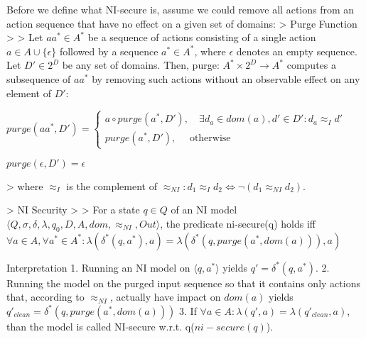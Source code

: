 \documentclass[a4paper]{article}
\begin{document}
\begin{multicols}{3}
    Before we define what NI-secure is, assume we could remove all actions from an action sequence that have no effect on a given set of domains:
    > Purge Function
    >
    > Let $aa^*\in A^*$ be a sequence of actions consisting of a single action $a\in A\cup\{\epsilon\}$ followed by a sequence $a^*\in A^*$, where $\epsilon$ denotes an empty sequence. Let $D'\in 2^D$ be any set of domains. Then, purge: $A^*\times 2^D \rightarrow A^*$ computes a subsequence of $aa^*$ by removing such actions without an observable effect on any element of $D':$
    \begin{itemize*}
        \item $purge(aa^*,D')=\begin{cases} a\circ purge(a^*,D'), \quad\exists d_a\in dom(a),d'\in D':d_a\approx_I d' \\ purge(a^*,D'), \quad\text{ otherwise }\end{cases}$
        \item $purge(\epsilon,D')=\epsilon$
    \end{itemize*}
    > where $\approx_I$ is the complement of $\approx_{NI}:d_1 \approx_I d_2\Leftrightarrow \lnot(d_1 \approx_{NI} d_2)$.

    > NI Security
    >
    > For a state $q\in Q$ of an NI model $⟨Q,\sigma,\delta,\lambda,q_0,D,A,dom,\approx_{NI},Out⟩$, the predicate ni-secure(q) holds iff $\forall a\in A,\forall a^*\in A^*:\lambda (\delta^*(q,a^*),a)=\lambda(\delta^*(q,purge(a^*,dom(a))),a)$

    Interpretation
    1. Running an NI model on $⟨q,a^*⟩$ yields $q'=\delta^*(q,a^*)$.
    2. Running the model on the purged input sequence so that it contains only actions that, according to $\approx_{NI}$, actually have impact on $dom(a)$ yields $q'_{clean}=\delta^*(q,purge(a^*,dom(a)))$
    3. If $\forall a\in A:\lambda(q',a)=\lambda(q'_{clean},a)$, than the model is called NI-secure w.r.t. q($ni-secure(q)$).


\end{multicols}
\end{document}
